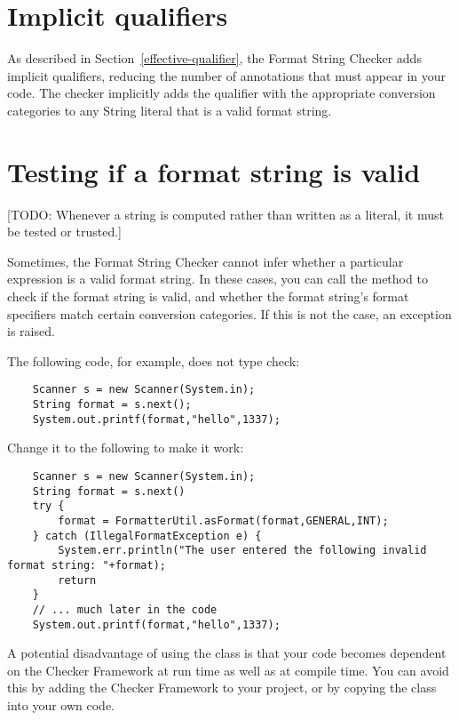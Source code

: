 \section{Implicit qualifiers\label{formatter-implicit}}

As described in Section~\ref{effective-qualifier}, the Format String Checker adds implicit
qualifiers, reducing the number of annotations that must appear in your code.
The checker implicitly adds the  qualifier with the appropriate
conversion categories to any String literal that is a valid format string.

\section{Testing if a format string is valid\label{formatter-run-time-tests}}


[TODO: Whenever a string is computed rather than written as a literal, it
must be tested or trusted.]


Sometimes, the Format String Checker cannot infer whether a particular
expression is a valid format string. In these cases, you can call the
method to check if the format string is valid, and whether the
format string's format specifiers match certain conversion categories.
If this is not the case, an exception is raised.

The following code, for example, does not type check:

\begin{Verbatim}
    Scanner s = new Scanner(System.in);    
    String format = s.next();
    System.out.printf(format,"hello",1337); 
\end{Verbatim}

\noindent Change it to the following to make it work:

\begin{Verbatim}
    Scanner s = new Scanner(System.in);
    String format = s.next()
    try {
        format = FormatterUtil.asFormat(format,GENERAL,INT); 
    } catch (IllegalFormatException e) {
        System.err.println("The user entered the following invalid format string: "+format);
        return
    }
    // ... much later in the code
    System.out.printf(format,"hello",1337); 
\end{Verbatim}

\noindent A potential disadvantage of using the  class is that your code becomes
dependent on the Checker Framework at run time as well as at compile time. You
can avoid this by adding the Checker Framework to your project, or by copying
the  class into your own code.

